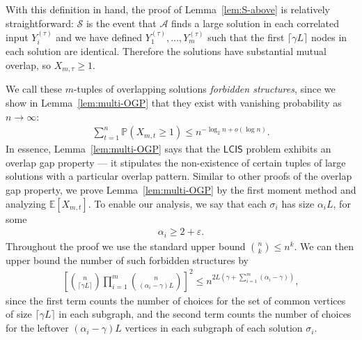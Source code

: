 \documentclass[11pt]{article}
\theoremstyle{plain}
\theoremstyle{definition}
\theoremstyle{remark}
\newcommand{\E}{\mathbb{E}}
\newcommand{\eps}{\varepsilon}
\newcommand{\MCS}{\mathsf{LCIS}}
\newcommand{\Alg}{\mathcal{A}}
\newcommand{\findManyLarge}{\mathcal{S}}
\renewcommand{\Pr}{\mathbb{P}}
\begin{document}
With this definition in hand, the proof of Lemma~\ref{lem:S-above} is relatively straightforward: $\findManyLarge$ is the event that $\Alg$ finds a large solution in each correlated input $Y_i^{(\tau)}$ and we have defined $Y_1^{(\tau)}, \dots, Y_m^{(\tau)}$ such that the first $\lceil \gamma L \rceil$ nodes in each solution are identical. Therefore the solutions have substantial mutual overlap, so $X_{m,\tau} \geq 1$. 

We call these $m$-tuples of overlapping solutions \emph{forbidden structures}, since we show in Lemma~\ref{lem:multi-OGP} that they exist with vanishing probability as $n \to \infty$:
\begin{align*}
    \sum_{t=1}^n \Pr(X_{m,t} \geq 1) \leq n^{-\log_2 n + o(\log n)}.
\end{align*}
In essence, Lemma~\ref{lem:multi-OGP} says that the $\MCS$ problem exhibits an overlap gap property --- it stipulates the non-existence of certain tuples of large solutions with a particular overlap pattern. Similar to other proofs of the overlap gap property, we prove Lemma~\ref{lem:multi-OGP} by the first moment method and analyzing $\E[X_{m,t}]$. To enable our analysis, we say that each $\sigma_i$ has size $\alpha_i L$, for some
\begin{align*}
    \alpha_i \geq 2 + \eps. %
\end{align*}
Throughout the proof we use the standard upper bound $\binom{n}{k} \leq n^k$. We can then upper bound the number of such forbidden structures by
\begin{align}
    \left[\binom{n}{\lceil \gamma L\rceil} \prod_{i=1}^m \binom{n}{(\alpha_i - \gamma)L}\right]^2 \leq n^{2L\left(\gamma + \sum_{i=1}^m (\alpha_i - \gamma)\right)}, \label{OGP-counting-informal}
\end{align}
since the first term counts the number of choices for the set of common vertices of size $\lceil \gamma L\rceil$ in each subgraph, and the second term counts the number of choices for the leftover $(\alpha_i - \gamma)L$ vertices in each subgraph of each solution $\sigma_i$.
\end{document}
